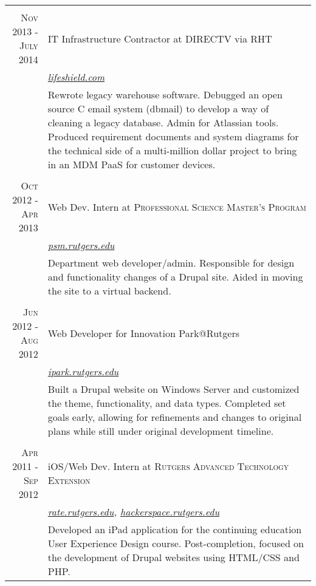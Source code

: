 \documentclass[a4paper, 10pt, onepage]{article} %
\begin{document}
\begin{tabular}{r|p{10cm}}
\multicolumn{2}{c}{}\\
\textsc{Nov 2013 - July 2014} & {IT Infrastructure Contractor at DIRECTV via RHT}\\
&\small\emph{\href{https://lifeshield.com}{lifeshield.com}}\\
&\footnotesize{Rewrote legacy warehouse software. Debugged an open source C email system (dbmail) to develop a way of cleaning a legacy database. Admin for Atlassian tools. Produced requirement documents and system diagrams for the technical side of a multi-million dollar project to bring in an MDM PaaS for customer devices.}\\

\multicolumn{2}{c}{}\\
\textsc{Oct 2012 - Apr 2013} & Web Dev. Intern at \textsc{Professional Science Master's Program}\\
& \small\emph{\href{https://psm.rutgers.edu}{psm.rutgers.edu}}\\
& \footnotesize{Department web developer/admin. Responsible for design and functionality changes of a Drupal site. Aided in moving the site to a virtual backend.}\\

\multicolumn{2}{c}{}\\
\textsc{Jun 2012 - Aug 2012} & Web Developer for Innovation Park@Rutgers\\
& \small\emph{\href{https://ipark.rutgers.edu}{ipark.rutgers.edu}}\\
& \footnotesize{Built a Drupal website on Windows Server and customized the theme, functionality, and data types. Completed set goals early, allowing for refinements and changes to original plans while still under original development timeline.}\\

\multicolumn{2}{c}{}\\
\textsc{Apr 2011 - Sep 2012} & iOS/Web Dev. Intern at \textsc{Rutgers Advanced Technology Extension}\\
& \small\emph{\href{https://rate.rutgers.edu}{rate.rutgers.edu}, \href{https://hackerspace.rutgers.edu}{hackerspace.rutgers.edu}}\\
& \footnotesize{Developed an iPad application for the continuing education User Experience Design course. Post-completion, focused on the development of Drupal websites using HTML/CSS and PHP.}
\end{tabular}
\end{document}
